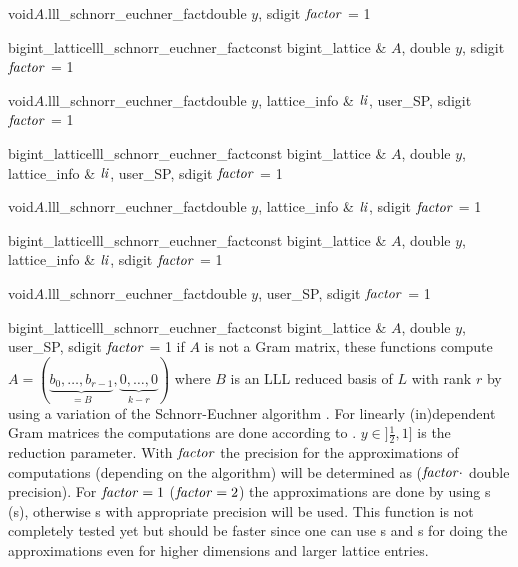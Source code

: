 
\begin{fcode}{void}{$A$.lll_schnorr_euchner_fact}{double $y$, sdigit $\mathit{factor}$ = 1}
\end{fcode}

\begin{fcode}{bigint_lattice}{lll_schnorr_euchner_fact}{const bigint_lattice & $A$,
    double $y$, sdigit $\mathit{factor}$ = 1}%
\end{fcode}

\begin{fcode}{void}{$A$.lll_schnorr_euchner_fact}{double $y$, lattice_info & $\mathit{li}$,
    user_SP, sdigit $\mathit{factor}$ = 1}%
\end{fcode}

\begin{fcode}{bigint_lattice}{lll_schnorr_euchner_fact}{const bigint_lattice & $A$,
    double $y$, lattice_info & $\mathit{li}$, user_SP, sdigit $\mathit{factor}$ = 1}%
\end{fcode}

\begin{fcode}{void}{$A$.lll_schnorr_euchner_fact}{double $y$, lattice_info & $\mathit{li}$,
    sdigit $\mathit{factor}$ = 1}%
\end{fcode}

\begin{fcode}{bigint_lattice}{lll_schnorr_euchner_fact}{const bigint_lattice & $A$,
    double $y$, lattice_info & $\mathit{li}$, sdigit $\mathit{factor}$ = 1}%
\end{fcode}

\begin{fcode}{void}{$A$.lll_schnorr_euchner_fact}{double $y$, user_SP, sdigit $\mathit{factor}$ = 1}
\end{fcode}

\begin{fcode}{bigint_lattice}{lll_schnorr_euchner_fact}{const bigint_lattice & $A$, double $y$,
    user_SP, sdigit $\mathit{factor}$ = 1}%
  if $A$ is not a Gram matrix, these functions compute $A = (\underbrace{b_0, \dots,
    b_{r-1}}_{=B}, \underbrace{0, \dots, 0}_{k-r})$ where $B$ is an LLL reduced basis of $L$
  with rank $r$ by using a variation of the Schnorr-Euchner algorithm \cite{Wetzel/Backes:2000}.
  For linearly (in)dependent Gram matrices the computations are done according to
  \cite{Cohen:1995}.  $y\in ]\frac{1}{2},1]$ is the reduction parameter.  With $\mathit{factor}$ the
  precision for the approximations of computations (depending on the algorithm) will be
  determined as ($\mathit{factor} \cdot$ double precision).  For $\mathit{factor} = 1$ ($\mathit{factor} = 2$) the
  approximations are done by using s (s), otherwise s
  with appropriate precision will be used.  This function is not completely tested yet but
  should be faster since one can use s and s for doing the
  approximations even for higher dimensions and larger lattice entries.
\end{fcode}

